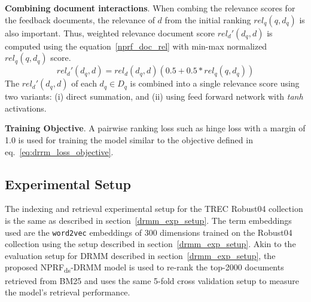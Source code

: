 \textbf{Combining document interactions}. When combing the relevance scores for the feedback documents, the relevance of $d$ from the initial ranking $rel_q(q, d_q)$ is also important. Thus, weighted relevance document score $rel_d'(d_q, d)$ is computed using the equation~\ref{nprf_doc_rel} with min-max normalized $rel_q(q, d_q)$ score.
\begin{equation}\label{nprf_doc_rel}
    rel_{d}'(d_q, d) = rel_d(d_q, d)(0.5 + 0.5 * rel_q(q, d_q))
\end{equation}
The $rel_d'(d_q, d)$ of each $d_q \in D_q$ is combined into a single relevance score using two variants: (i) direct summation, and (ii) using feed forward network with \textit{tanh} activations.

\textbf{Training Objective}. A pairwise ranking loss such as hinge loss with a margin of 1.0 is used for training the model similar to the objective defined in eq.~\ref{eq:drrm_loss_objective}.

\subsection{Experimental Setup}
\label{sec:nprf_drmm_reproducibility_exp}

The indexing and retrieval experimental setup for the TREC Robust04 collection is the same as described in section~\ref{drmm_exp_setup}. The term embeddings used are the \texttt{word2vec} embeddings of 300 dimensions trained on the Robust04 collection using the setup described in section~\ref{drmm_exp_setup}. Akin to the evaluation setup for DRMM described in section~\ref{drmm_exp_setup}, the proposed NPRF\textsubscript{ds}-DRMM model is used to re-rank the top-2000 documents retrieved from BM25 and uses the same 5-fold cross validation setup to measure the model's retrieval performance.

